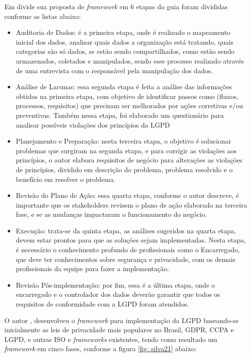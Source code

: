 \documentclass[
	12pt,				%
	openright,			%
	oneside,			%
	a4paper,			%
	english,			%
	french,				%
	spanish,			%
	brazil,				%
	]{abntex2}
\begin{document}
Em  divide sua proposta de \textit{framework} em 6 etapas do guia foram divididas conforme as listas abaixo:
\begin{itemize}
\item Auditoria de Dados: é a primeira etapa, onde é realizado o mapeamento inicial dos dados, analisar quais dados a organização está tratando, quais categorias são só dados, se estão sendo compartilhados, como estão sendo armazenados, coletados e manipulados, sendo esse processo realizado através de uma entrevista com o responsável pela manipulação dos dados.
\item Análise de Lacunas: essa segunda etapa é feita a análise das informações obtidas na primeira etapa, com objetivo de identificar passos como (fluxos, processos, requisitos) que precisam ser melhorados por ações corretivas e/ou preventivas. Também nessa etapa, foi elaborado um questionário para analisar possíveis violações dos princípios da LGPD
\item Planejamento e Preparação: nesta terceira etapa, o objetivo é solucionar problemas que surgiram na segunda etapa, e para corrigir as violações aos princípios, o autor elabora requisitos de negócio para alterações as violações de princípios, dividido em descrição do problema, problema resolvido e o benefício em resolver o problema. 
\item Revisão do Plano de Ação: essa quarta etapa, conforme o autor descreve, é importante que os stakeholders revisem o plano de ação elaborado na terceira fase, e se as mudanças impactaram o funcionamento do negócio.
\item Execução: trata-se da quinta etapa, as análises sugeridos na quarta etapa, devem estar prontos para que as soluções sejam implementadas. Nesta etapa, é necessário o conhecimento profundo de profissionais como o Encarregado, que deve ter conhecimentos sobre segurança e privacidade, com os demais profissionais da equipe para fazer a implementação.
\item Revisão Pós-implementação: por fim, essa é a última etapa, onde o encarregado e o controlador dos dados deverão garantir que todos os requisitos de conformidade com a LGPD foram atendidos.
\end{itemize}




O autor , desenvolveu o \textit{framework} para implementação da LGPD baseando-se inicialmente as leis de privacidade mais populares no Brasil, GDPR, CCPA e LGPD, e outras ISO e \textit{frameworks} existentes, tendo como resultado um \textit{framework} em cinco fases, conforme a figura \ref{fig: silva21} abaixo:
\end{document}
